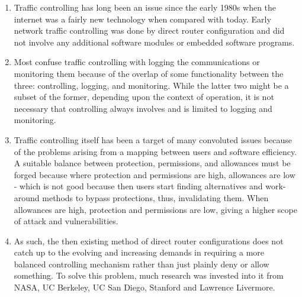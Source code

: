 \documentclass[12pt]{extarticle}
\newcommand{\ben}{\begin{enumerate}}
\newcommand{\een}{\end{enumerate}}
\begin{document}
\vfill

\ben

\item {Traffic controlling has long been an issue since the early 1980s when the internet was a fairly new technology when compared with today. Early network traffic controlling was done by direct router configuration and did not involve any additional software modules or embedded software programs.}


\item {Most confuse traffic controlling with logging the communications or monitoring them because of the overlap of some functionality between the three: controlling, logging, and monitoring. While the latter two might be a subset of the former, depending upon the context of operation, it is not necessary that controlling always involves and is limited to logging and monitoring.}


\item {Traffic controlling itself has been a target of many convoluted issues because of the problems arising from a mapping between users and software efficiency. A suitable balance between protection, permissions, and allowances must be forged because where protection and permissions are high, allowances are low - which is not good because then users start finding alternatives and work-around methods to bypass protections, thus, invalidating them. When allowances are high, protection and permissions are low, giving a higher scope of attack and vulnerabilities.}


\item {As such, the then existing method of direct router configurations does not catch up to the evolving and increasing demands in requiring a more balanced controlling mechanism rather than just plainly deny or allow something. To solve this problem, much research was invested into it from NASA, UC Berkeley, UC San Diego, Stanford and Lawrence Livermore.}
\een


\end{document}
